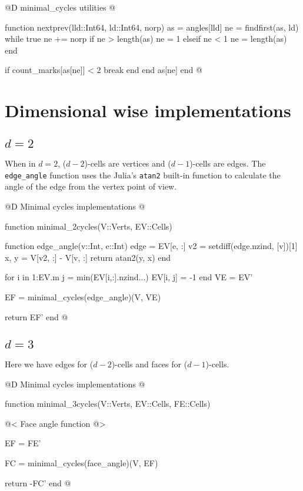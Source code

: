 @D minimal\_cycles utilities
@{function nextprev(lld::Int64, ld::Int64, norp)
    as = angles[lld]
    ne = findfirst(as, ld)
    while true
        ne += norp
        if ne > length(as)
            ne = 1
        elseif ne < 1
            ne = length(as)
        end

        if count_marks[as[ne]] < 2
            break
        end
    end
    as[ne]
end
@}



\section{Dimensional wise implementations}
\label{sec:angles_fn}

\subsection{$d=2$}

When in $d=2$, ($d-2$)-cells are vertices and ($d-1$)-cells are edges.
The \texttt{edge\_angle} function uses the Julia's \texttt{atan2} 
built-in function to calculate the angle of the edge from the vertex point of view.

@D Minimal cycles implementations
@{function minimal_2cycles(V::Verts, EV::Cells)

    function edge_angle(v::Int, e::Int)
        edge = EV[e, :]
        v2 = setdiff(edge.nzind, [v])[1]
        x, y = V[v2, :] - V[v, :]
        return atan2(y, x)
    end

    for i in 1:EV.m
        j = min(EV[i,:].nzind...)
        EV[i, j] = -1
    end
    VE = EV'

    EF = minimal_cycles(edge_angle)(V, VE)

    return EF'
end
@}


\subsection{$d=3$}
\label{sec:3d_minimal_cycles}

Here we have edges for ($d-2$)-cells and faces for ($d-1$)-cells.

@D Minimal cycles implementations
@{function minimal_3cycles(V::Verts, EV::Cells, FE::Cells)

    @< Face angle function @>

    EF = FE'

    FC = minimal_cycles(face_angle)(V, EF)

    return -FC'
end
@}

